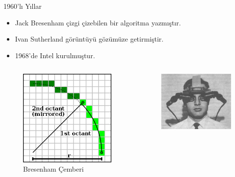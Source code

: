 \documentclass{beamer}
\begin{document}
\begin{frame}[fragile]{1960'lı Yıllar}
\begin{itemize}
\item Jack Bresenham çizgi çizebilen bir algoritma yazmıştır.
\item Ivan Sutherland görüntüyü gözümüze getirmiştir.
\item 1968'de Intel kurulmuştur.
\end{itemize}
\begin{columns}
\begin{column}{0.3\textwidth}
\begin{figure}
\includegraphics[width=\textwidth]{Bresenham_circle.svg.png}
\caption{Bresenham Çemberi}
\end{figure}
\end{column}
\begin{column}{0.4\textwidth}
\begin{figure}
\includegraphics[width=\textwidth]{vr.PNG}

\end{figure}
\end{column}
\end{columns}
\end{frame}
\end{document}
